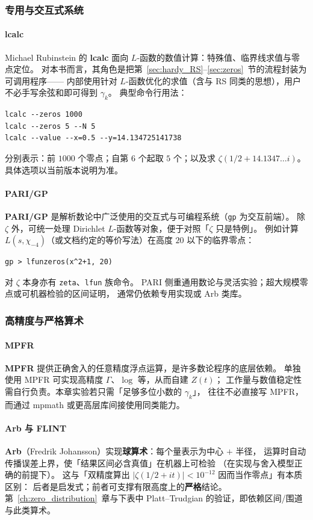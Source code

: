 \subsubsection{专用与交互式系统}

\paragraph{lcalc}
Michael Rubinstein 的 \textbf{lcalc} 面向 $L$-函数的数值计算：特殊值、临界线求值与零点定位。
对本书而言，其角色是把第~\ref{sec:hardy_RS}--\ref{sec:zeros}~节的流程封装为可调用程序——
内部使用针对 $L$-函数优化的求值（含与 RS 同类的思想），用户不必手写余弦和即可得到 $\gamma_k$。
典型命令行用法：
\begin{verbatim}
lcalc --zeros 1000
lcalc --zeros 5 --N 5
lcalc --value --x=0.5 --y=14.134725141738
\end{verbatim}
分别表示：前 $1000$ 个零点；自第 $6$ 个起取 $5$ 个；以及求 $\zeta(1/2+14.1347\ldots i)$。
具体选项以当前版本说明为准。

\paragraph{PARI/GP}
\textbf{PARI/GP} 是解析数论中广泛使用的交互式与可编程系统（\texttt{gp} 为交互前端）。
除 $\zeta$ 外，可统一处理 Dirichlet $L$-函数等对象，便于对照「$\zeta$ 只是特例」。
例如计算 $L(s,\chi_{-4})$（或文档约定的等价写法）在高度 $20$ 以下的临界零点：
\begin{verbatim}
gp > lfunzeros(x^2+1, 20)
\end{verbatim}
对 $\zeta$ 本身亦有 \texttt{zeta}、\texttt{lfun} 族命令。
PARI 侧重通用数论与灵活实验；超大规模零点或可机器检验的区间证明，
通常仍依赖专用实现或 Arb 类库。

\subsubsection{高精度与严格算术}

\paragraph{MPFR}
\textbf{MPFR} 提供正确舍入的任意精度浮点运算，是许多数论程序的底层依赖。
单独使用 MPFR 可实现高精度 $\Gamma$、$\log$ 等，从而自建 $Z(t)$；
工作量与数值稳定性需自行负责。本章实验若只需「足够多位小数的 $\gamma_k$」，
往往不必直接写 MPFR，而通过 mpmath 或更高层库间接使用同类能力。

\paragraph{Arb 与 FLINT}
\textbf{Arb}（Fredrik Johansson）实现\textbf{球算术}：每个量表示为中心 $+$ 半径，
运算时自动传播误差上界，使「结果区间必含真值」在机器上可检验
（在实现与舍入模型正确的前提下）。
这与「双精度算出 $|\zeta(1/2+it)|<10^{-12}$ 因而当作零点」有本质区别：
后者是启发式；前者可支撑有限高度上的\textbf{严格}结论。
第~\ref{ch:zero_distribution}~章与下表中 Platt--Trudgian 的验证，即依赖区间/围道与此类算术。

